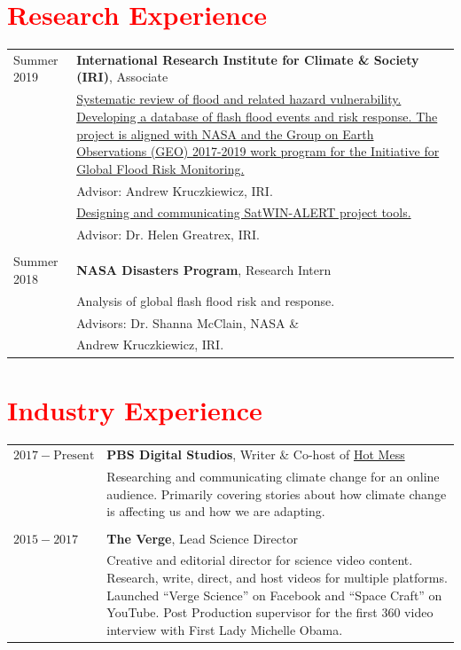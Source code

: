 \documentclass[margin, line]{res}
\begin{document}
\begin{resume}
\section{\sc \textcolor{Red}{\large{Research Experience}}}
\vspace*{0.05in}
\begin{tabular}{@{}p{1 in}p{4in}}
Summer 2019  & \textbf{International Research Institute for Climate \& Society (IRI)}, Associate \\
& \href{GEO}{Systematic review of flood and related hazard vulnerability.  Developing a database of flash flood events and risk response. The project is aligned with NASA and the Group on Earth Observations (GEO) 2017-2019 work program for the Initiative for Global Flood Risk Monitoring.} \\
& \hspace{0.2in} Advisor: Andrew Kruczkiewicz, IRI.\\
& \href{SatWIN}{Designing and communicating SatWIN-ALERT project tools.} \\
& \hspace{0.2in} Advisor: Dr. Helen Greatrex, IRI. \ 
\\ \\
Summer 2018 & \textbf{NASA Disasters Program}, Research Intern  \\
& Analysis of global flash flood risk and response.  \\
& \hspace{0.2in} Advisors:  Dr. Shanna McClain, NASA \& \\
& \hspace{.82in} Andrew Kruczkiewicz, IRI. \\

\end{tabular}

\section{\sc \textcolor{Red}{\large{Industry Experience}}}
\vspace*{0.05in}
\begin{tabular}{@{}p{1 in}p{4in}}
$2017 - \text{Present}$  & \textbf{PBS Digital Studios}, Writer \& Co-host of \href{HM}{Hot Mess}\\
& Researching and communicating climate change for an online audience. Primarily covering stories about how climate change is affecting us and how we are adapting.\\
\\
$2015 - 2017$ & \textbf{The Verge}, Lead Science Director  \\
& Creative and editorial director for science video content. Research, write, direct, and host videos for multiple platforms. Launched “Verge Science” on Facebook and “Space Craft” on YouTube.  Post Production supervisor for the first 360 video interview with First Lady Michelle Obama. \\


\end{tabular}
\end{resume}
\end{document}

